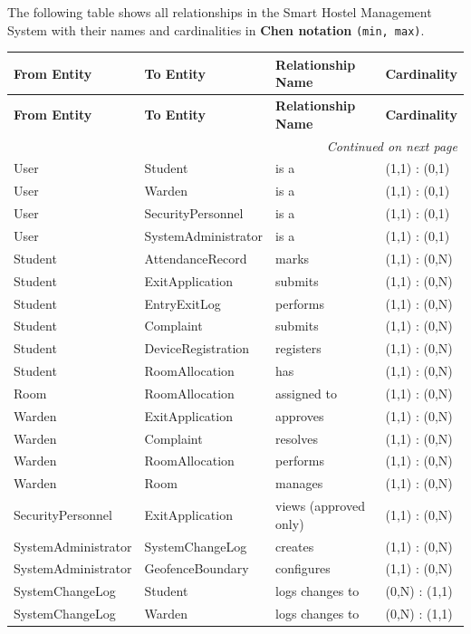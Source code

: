 \documentclass[12pt,a4paper]{article}
\begin{document}
The following table shows all relationships in the Smart Hostel Management System with their names and cardinalities in \textbf{Chen notation} \texttt{(min, max)}.

\begin{longtable}{|p{4cm}|p{4cm}|p{3.5cm}|p{2.5cm}|}
\hline
\textbf{From Entity} & \textbf{To Entity} & \textbf{Relationship Name} & \textbf{Cardinality} \\
\hline
\endfirsthead
\hline
\textbf{From Entity} & \textbf{To Entity} & \textbf{Relationship Name} & \textbf{Cardinality} \\
\hline
\endhead
\hline
\multicolumn{4}{r}{\textit{Continued on next page}} \\
\endfoot
\hline
\endlastfoot

User & Student & is a & (1,1) : (0,1) \\
User & Warden & is a & (1,1) : (0,1) \\
User & SecurityPersonnel & is a & (1,1) : (0,1) \\
User & SystemAdministrator & is a & (1,1) : (0,1) \\
Student & AttendanceRecord & marks & (1,1) : (0,N) \\
Student & ExitApplication & submits & (1,1) : (0,N) \\
Student & EntryExitLog & performs & (1,1) : (0,N) \\
Student & Complaint & submits & (1,1) : (0,N) \\
Student & DeviceRegistration & registers & (1,1) : (0,N) \\
Student & RoomAllocation & has & (1,1) : (0,N) \\
Room & RoomAllocation & assigned to & (1,1) : (0,N) \\
Warden & ExitApplication & approves & (1,1) : (0,N) \\
Warden & Complaint & resolves & (1,1) : (0,N) \\
Warden & RoomAllocation & performs & (1,1) : (0,N) \\
Warden & Room & manages & (1,1) : (0,N) \\
SecurityPersonnel & ExitApplication & views (approved only) & (1,1) : (0,N) \\
SystemAdministrator & SystemChangeLog & creates & (1,1) : (0,N) \\
SystemAdministrator & GeofenceBoundary & configures & (1,1) : (0,N) \\
SystemChangeLog & Student & logs changes to & (0,N) : (1,1) \\
SystemChangeLog & Warden & logs changes to & (0,N) : (1,1) \\

\end{longtable}
\end{document}
